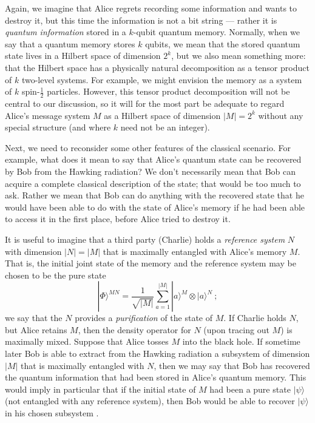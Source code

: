 \documentclass[11pt]{article}
\begin{document}
Again, we imagine that Alice regrets recording some information and wants to destroy it, but this time the information is not a bit string --- rather it is {\em quantum information} stored in a $k$-qubit quantum memory. Normally, when we say that a quantum memory stores $k$ qubits, we mean that the stored quantum state lives in a Hilbert space of dimension $2^k$, but we also mean something more: that the Hilbert space has a physically natural decomposition as a tensor product of $k$ two-level systems. For example, we might envision the memory as a system of $k$ spin-$\frac{1}{2}$ particles. However, this tensor product decomposition will not be central to our discussion, so it will for the most part be adequate to regard Alice's message system $M$ as a Hilbert space of dimension $|M| =2^k$ without any special structure (and where $k$ need not be an integer).

Next, we need to reconsider some other features of the classical scenario. For example, what does it mean to say that Alice's quantum state can be recovered by Bob from the Hawking radiation? We don't necessarily mean that Bob can acquire a complete classical description of the state; that would be too much to ask. Rather we mean that Bob can do anything with the recovered state that he would have been able to do with the state of Alice's memory if he had been able to access it in the first place, before Alice tried to destroy it. 

It is useful to imagine that a third party (Charlie) holds a {\em reference system} $N$ with dimension $|N|=|M|$ that is maximally entangled with Alice's memory $M$. That is, the initial joint state of the memory and the reference system may be chosen to be the pure state
\begin{equation}
|\Phi\rangle^{MN}=\frac{1}{\sqrt{|M|}}\sum_{a=1}^{|M|} |a\rangle^M\otimes |a\rangle^N~;
\end{equation}
we say that the $N$ provides a {\em purification} of the state of $M$. If Charlie holds $N$, but Alice retains $M$, then the density operator for $N$ (upon tracing out $M$) is maximally mixed. Suppose that Alice tosses $M$ into the black hole. If sometime later Bob is able to extract from the Hawking radiation a subsystem of dimension $|M|$ that is maximally entangled with $N$, then we may say that Bob has recovered the quantum information that had been stored in Alice's quantum memory. This would imply in particular that if the initial state of $M$ had been a pure state $|\psi\rangle$ (not entangled with any reference system), then Bob would be able to recover $|\psi\rangle$ in his chosen subsystem \cite{barnum}.
\end{document}
